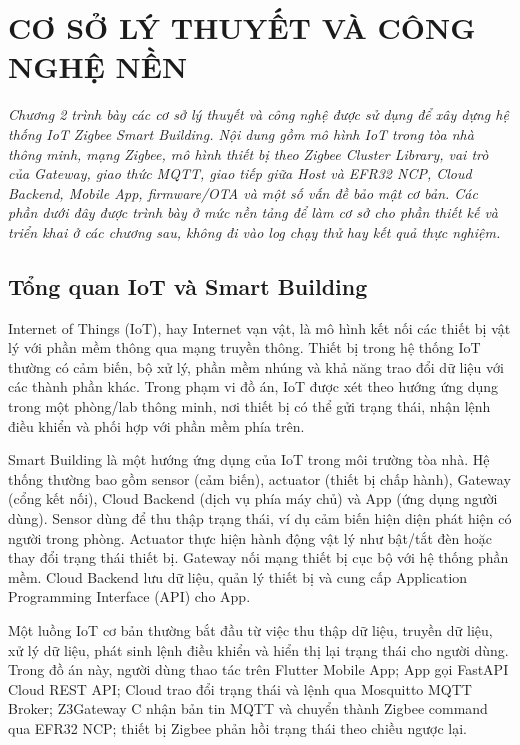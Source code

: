 \chapter{CƠ SỞ LÝ THUYẾT VÀ CÔNG NGHỆ NỀN}
\label{ch:lythuyet}

\vspace{0.5cm}
\noindent\textit{Chương 2 trình bày các cơ sở lý thuyết và công nghệ được sử dụng để xây dựng hệ thống IoT Zigbee Smart Building. Nội dung gồm mô hình IoT trong tòa nhà thông minh, mạng Zigbee, mô hình thiết bị theo Zigbee Cluster Library, vai trò của Gateway, giao thức MQTT, giao tiếp giữa Host và EFR32 NCP, Cloud Backend, Mobile App, firmware/OTA và một số vấn đề bảo mật cơ bản. Các phần dưới đây được trình bày ở mức nền tảng để làm cơ sở cho phần thiết kế và triển khai ở các chương sau, không đi vào log chạy thử hay kết quả thực nghiệm.}
\vspace{0.5cm}

\section{Tổng quan IoT và Smart Building}
\label{sec:ch2-iot-smart-building}

Internet of Things (IoT), hay Internet vạn vật, là mô hình kết nối các thiết bị vật lý với phần mềm thông qua mạng truyền thông. Thiết bị trong hệ thống IoT thường có cảm biến, bộ xử lý, phần mềm nhúng và khả năng trao đổi dữ liệu với các thành phần khác. Trong phạm vi đồ án, IoT được xét theo hướng ứng dụng trong một phòng/lab thông minh, nơi thiết bị có thể gửi trạng thái, nhận lệnh điều khiển và phối hợp với phần mềm phía trên.

Smart Building là một hướng ứng dụng của IoT trong môi trường tòa nhà. Hệ thống thường bao gồm sensor (cảm biến), actuator (thiết bị chấp hành), Gateway (cổng kết nối), Cloud Backend (dịch vụ phía máy chủ) và App (ứng dụng người dùng). Sensor dùng để thu thập trạng thái, ví dụ cảm biến hiện diện phát hiện có người trong phòng. Actuator thực hiện hành động vật lý như bật/tắt đèn hoặc thay đổi trạng thái thiết bị. Gateway nối mạng thiết bị cục bộ với hệ thống phần mềm. Cloud Backend lưu dữ liệu, quản lý thiết bị và cung cấp Application Programming Interface (API) cho App.

Một luồng IoT cơ bản thường bắt đầu từ việc thu thập dữ liệu, truyền dữ liệu, xử lý dữ liệu, phát sinh lệnh điều khiển và hiển thị lại trạng thái cho người dùng. Trong đồ án này, người dùng thao tác trên Flutter Mobile App; App gọi FastAPI Cloud REST API; Cloud trao đổi trạng thái và lệnh qua Mosquitto MQTT Broker; Z3Gateway C nhận bản tin MQTT và chuyển thành Zigbee command qua EFR32 NCP; thiết bị Zigbee phản hồi trạng thái theo chiều ngược lại.

